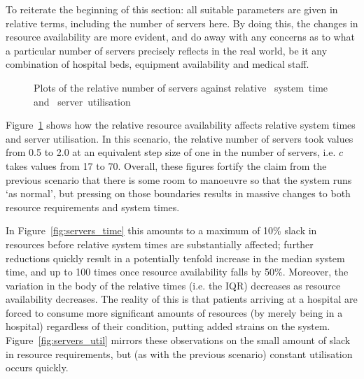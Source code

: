 \documentclass[]{interact}
\newlength{\imgwidth}
\theoremstyle{plain}%
\theoremstyle{definition}
\theoremstyle{remark}
\begin{document}
To reiterate the beginning of this section: all suitable parameters are given in
relative terms, including the number of servers here. By doing this, the changes
in resource availability are more evident, and do away with any concerns as to
what a particular number of servers precisely reflects in the real world, be it
any combination of hospital beds, equipment availability and medical staff.

\begin{figure}
    \centering

    \caption{%
        Plots of the relative number of servers against relative
        ~system~time and
        ~server~utilisation
    }\label{fig:servers}
\end{figure}

Figure~\ref{fig:servers} shows how the relative resource availability affects
relative system times and server utilisation. In this scenario, the relative
number of servers took values from 0.5 to 2.0 at an equivalent step size of one
in the number of servers, i.e. \(c\) takes values from 17 to 70. Overall, these
figures fortify the claim from the previous scenario that there is some room to
manoeuvre so that the system runs `as normal', but pressing on those boundaries
results in massive changes to both resource requirements and system times.

In Figure~\ref{fig:servers_time} this amounts to a maximum of 10\% slack in
resources before relative system times are substantially affected; further
reductions quickly result in a potentially tenfold increase in the median system
time, and up to 100 times once resource availability falls by 50\%. Moreover,
the variation in the body of the relative times (i.e. the IQR) decreases as
resource availability decreases. The reality of this is that patients arriving
at a hospital are forced to consume more significant amounts of resources (by
merely being in a hospital) regardless of their condition, putting added strains
on the system. Figure~\ref{fig:servers_util} mirrors these observations on the
small amount of slack in resource requirements, but (as with the previous
scenario) constant utilisation occurs quickly.
\end{document}
